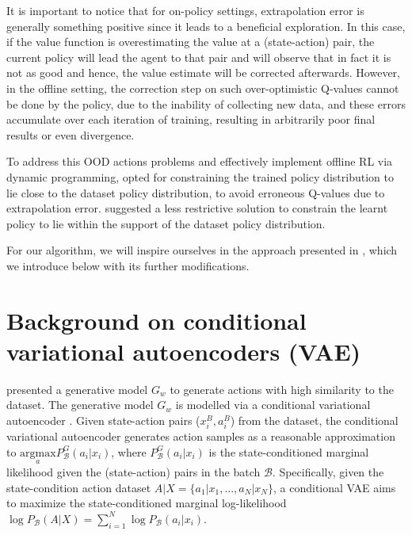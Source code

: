 It is important to notice that for on-policy settings, extrapolation error is generally something positive since it
leads to a beneficial exploration. In this case, if the value function is overestimating the value at
a (state-action) pair, the current policy will lead the agent to that pair and will observe that in fact
it is not as good and hence, the value estimate will be corrected afterwards.
However, in the offline setting, the correction step on such over-optimistic Q-values cannot be done by the 
policy, due to the inability of collecting new data, and these errors accumulate over each iteration of training,
resulting in arbitrarily poor final results or even divergence.


To address this OOD actions problems and effectively implement offline RL via dynamic programming,
\citet{Fujimoto2018} opted for constraining the trained policy distribution to lie close to
the dataset policy distribution, to avoid erroneous Q-values due to extrapolation error.
\citet{Kumar2019} suggested a less restrictive solution to constrain the learnt policy to lie
within the support of the dataset policy distribution.

For our algorithm, we will inspire ourselves in the approach presented in 
\citet{Fujimoto2019}, which we introduce below with its further modifications.

\section{Background on conditional variational autoencoders (VAE)}
\citet{Fujimoto2019} presented a generative model $G_w$
to generate actions with high similarity to the dataset.
The generative model $G_w$ is modelled via a conditional variational autoencoder \cite{Kingma2014}.
Given state-action pairs ($x^B_i,a^B_i$) from the dataset, the conditional variational autoencoder
generates action samples as a reasonable approximation to
$\underset{a}{\text{argmax}}  P _\mathcal{B}^G(a_i|x_i)$, where $P_\mathcal{B}^G(a_i|x_i)$ is 
the state-conditioned marginal likelihood given the (state-action) pairs in the 
batch $\mathcal{B}$.
Specifically, given the state-condition action dataset $A|X = \{a_1|x_1,...,a_N|x_N\}$,
a conditional VAE aims to maximize the state-conditioned marginal log-likelihood  
$\log P_\mathcal{B}(A|X) = \sum_{i=1}^{N}\log  P_\mathcal{B}(a_i|x_i)$.

